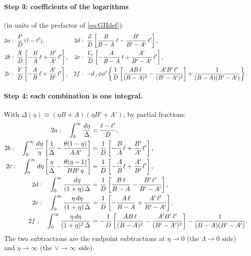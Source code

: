 \documentclass[10pt]{article}
\numberwithin{equation}{section}
\begin{document}
\paragraph{Step 3: coefficients of the logarithms} (in units of the prefactor of \eqref{eq:GIIdef}):
\begin{align}
2a&:\; \frac{P}{D}\,(\ell-\ell'), &
2d&:\; \frac{Z}{D}\left[\frac{B}{B-A}\,\ell-\frac{B'}{B'-A'}\,\ell'\right],\notag\\
2b&:\; \frac{X}{D}\left[-\frac{B}{A}\,\ell+\frac{B'}{A'}\,\ell'\right], &
2e&:\; \frac{V_{e}}{D}\left[-\frac{A}{B-A}\,\ell+\frac{A'}{B'-A'}\,\ell'\right],\notag\\
2c&:\; \frac{Y}{D}\left[-\frac{A}{B}\,\ell+\frac{A'}{B'}\,\ell'\right], &
2f&:\; -d_{\perp}\phi\phi'\left\{\frac{1}{D}\left[\frac{AB\,\ell}{(B-A)^{2}}-\frac{A'B'\,\ell'}{(B'-A')^{2}}\right]+\frac{1}{(B-A)(B'-A')}\right\}.
\end{align}

\paragraph{Step 4: each combination is one integral.} With $\Delta(\eta)\equiv(\eta B+A)(\eta B'+A')$, by partial fractions:
\begin{align}
2a:\quad\int_{0}^{\infty}\frac{d\eta}{\Delta}&=\frac{\ell-\ell'}{D},\notag\\
2b:\quad\int_{0}^{\infty}\frac{d\eta}{\eta}\left[\frac{1}{\Delta}-\frac{\theta(1-\eta)}{AA'}\right]&=\frac{1}{D}\left[-\frac{B}{A}\ell+\frac{B'}{A'}\ell'\right],\notag\\
2c:\quad\int_{0}^{\infty}d\eta\left[\frac{\eta}{\Delta}-\frac{\theta(\eta-1)}{BB'\,\eta}\right]&=\frac{1}{D}\left[-\frac{A}{B}\ell+\frac{A'}{B'}\ell'\right],\notag\\
2d:\quad\int_{0}^{\infty}\frac{d\eta}{(1+\eta)\,\Delta}&=\frac{1}{D}\left[\frac{B\,\ell}{B-A}-\frac{B'\,\ell'}{B'-A'}\right],\notag\\
2e:\quad\int_{0}^{\infty}\frac{\eta\,d\eta}{(1+\eta)\,\Delta}&=\frac{1}{D}\left[-\frac{A\,\ell}{B-A}+\frac{A'\,\ell'}{B'-A'}\right],\notag\\
2f:\quad\int_{0}^{\infty}\frac{\eta\,d\eta}{(1+\eta)^{2}\,\Delta}&=-\frac{1}{D}\left[\frac{AB\,\ell}{(B-A)^{2}}-\frac{A'B'\,\ell'}{(B'-A')^{2}}\right]-\frac{1}{(B-A)(B'-A')} .
\end{align}
The two subtractions are the endpoint subtractions at $\eta\to0$ (the $\Lambda\to0$ side) and $\eta\to\infty$ (the $\vee\to\infty$ side).
\end{document}
